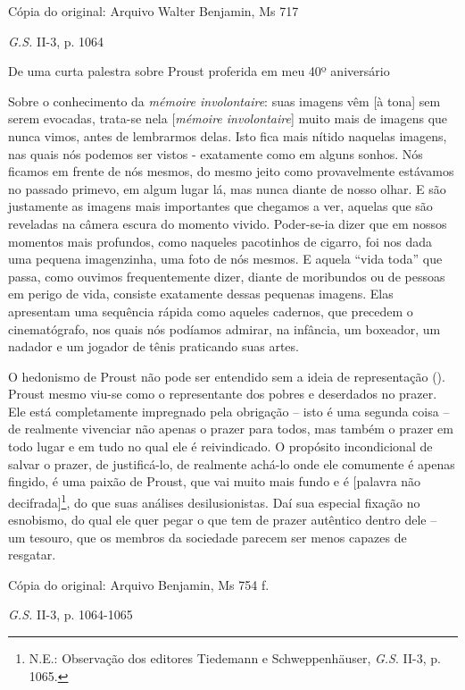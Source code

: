 Cópia do original: Arquivo Walter Benjamin, Ms 717

\emph{G.S.} II-3, p. 1064

De uma curta palestra sobre Proust proferida em meu 40º aniversário

Sobre o conhecimento da \emph{mémoire involontaire}: suas imagens vêm
{[}à tona{]} sem serem evocadas, trata-se nela {[}\emph{mémoire
involontaire}{]} muito mais de imagens que nunca vimos, antes de
lembrarmos delas. Isto fica mais nítido naquelas imagens, nas quais nós
podemos ser vistos - exatamente como em alguns sonhos. Nós ficamos em
frente de nós mesmos, do mesmo jeito como provavelmente estávamos no
passado primevo, em algum lugar lá, mas nunca diante de nosso olhar. E
são justamente as imagens mais importantes que chegamos a ver, aquelas
que são reveladas na câmera escura do momento vivido. Poder-se-ia dizer
que em nossos momentos mais profundos, como naqueles pacotinhos de
cigarro, foi nos dada uma pequena imagenzinha, uma foto de nós mesmos. E
aquela ``vida toda'' que passa, como ouvimos frequentemente dizer,
diante de moribundos ou de pessoas em perigo de vida, consiste
exatamente dessas pequenas imagens. Elas apresentam uma sequência rápida
como aqueles cadernos, que precedem o cinematógrafo, nos quais nós
podíamos admirar, na infância, um boxeador, um nadador e um jogador de
tênis praticando suas artes.

O hedonismo de Proust não pode ser entendido sem a ideia de
representação (). Proust mesmo viu-se como o representante dos pobres e
deserdados no prazer. Ele está completamente impregnado pela obrigação
-- isto é uma segunda coisa -- de realmente vivenciar não apenas o
prazer para todos, mas também o prazer em todo lugar e em tudo no qual
ele é reivindicado. O propósito incondicional de salvar o prazer, de
justificá-lo, de realmente achá-lo onde ele comumente é apenas fingido,
é uma paixão de Proust, que vai muito mais fundo e é {[}palavra não
decifrada{]}\footnote{N.E.: Observação dos editores Tiedemann e
  Schweppenhäuser, \emph{G.S}. II-3, p. 1065.}, do que suas análises
desilusionistas. Daí sua especial fixação no esnobismo, do qual ele quer
pegar o que tem de prazer autêntico dentro dele -- um tesouro, que os
membros da sociedade parecem ser menos capazes de resgatar.

Cópia do original: Arquivo Benjamin, Ms 754 f.

\emph{G.S.} II-3, p. 1064-1065
